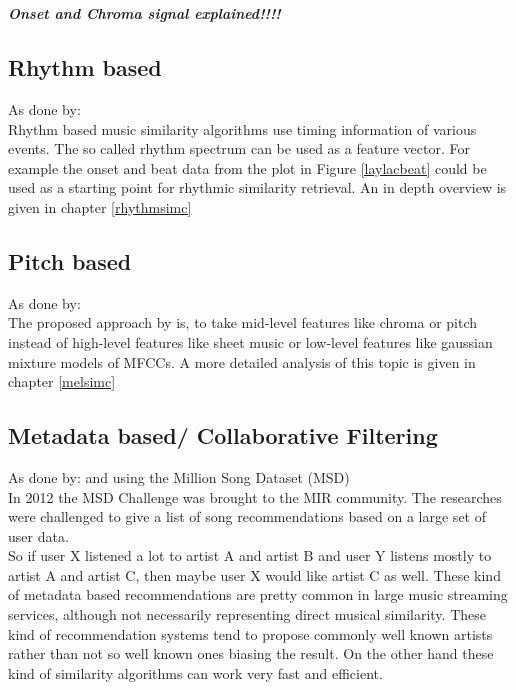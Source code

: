 \FloatBarrier
\ \\
\ \\
\textit{\textbf{Onset and Chroma signal explained!!!!}}\\

\subsection{Rhythm based}
As done by: \cite{rhythm1}\\
Rhythm based music similarity algorithms use timing information of various events. The so called rhythm spectrum can be used as a feature vector.
For example the onset and beat data from the plot in Figure \ref{laylacbeat} could be used as a starting point for rhythmic similarity retrieval.
An in depth overview is given in chapter \ref{rhythmsimc}

\subsection{Pitch based}

As done by: \cite{pitch1}\\
The proposed approach by \cite{pitch1} is, to take mid-level features like chroma or pitch instead of high-level features like sheet music or low-level features like gaussian mixture models of MFCCs. 
A more detailed analysis of this topic is given in chapter \ref{melsimc}


\subsection{Metadata based/ Collaborative Filtering}

As done by: \cite{metadat1} and \cite{msd4} using the Million Song Dataset (MSD) \cite{msd1}\\
In 2012 the MSD Challenge was brought to the MIR community. The researches were challenged to give a list of song recommendations based on a large set of user data.\\ 
So if user X listened a lot to artist A and artist B and user Y listens mostly to artist A and artist C, then maybe user X would like artist C as well. 
These kind of metadata based recommendations are pretty common in large music streaming services, although not necessarily representing direct musical similarity.
These kind of recommendation systems tend to propose commonly well known artists rather than not so well known ones biasing the result. 
On the other hand these kind of similarity algorithms can work very fast and efficient.  

